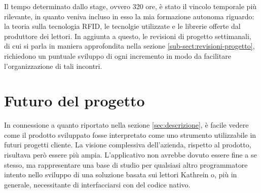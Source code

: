 Il tempo determinato dallo stage, ovvero 320 ore, è stato il vincolo temporale più rilevante, in quanto veniva incluso in esso la mia
formazione autonoma riguardo: la teoria sulla tecnologia RFID, le tecnolgie utilizzate e le librerie offerte dal produttore dei lettori.
In aggiunta a questo, le revisioni di progetto settimanali, di cui si parla in maniera approfondita nella sezione \ref{sub-sect:revisioni-progetto},
richiedono un puntuale sviluppo di ogni incremento in modo da facilitare l'organizzazione di tali incontri.
\section{Futuro del progetto}
In connessione a quanto riportato nella sezione \ref{sec:descrizione}, è facile vedere come il prodotto sviluppato fosse interpretato come uno strumento utilizzabile
in futuri progetti cliente. La visione complessiva dell'azienda, rispetto al prodotto, risultava però essere più ampia. 
L'applicativo non avrebbe dovuto essere fine a se stesso, ma rappresentare una base di studio per qualsiasi altro programmatore intento nello sviluppo 
di una soluzione basata sui lettori Kathrein o, più in generale, necessitante di interfacciarsi con del codice nativo.


